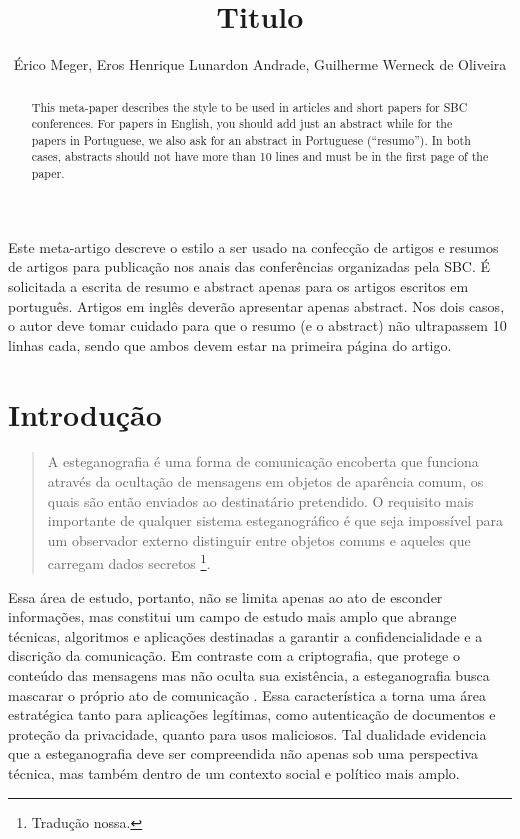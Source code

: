 \documentclass[12pt]{article}
\title{Titulo}
\author{Érico Meger\inst{1}, Eros Henrique Lunardon Andrade\inst{1}, Guilherme Werneck de Oliveira\inst{1}}
\begin{document}
\maketitle

\begin{abstract}
  This meta-paper describes the style to be used in articles and short papers
  for SBC conferences. For papers in English, you should add just an abstract
  while for the papers in Portuguese, we also ask for an abstract in
  Portuguese (``resumo''). In both cases, abstracts should not have more than
  10 lines and must be in the first page of the paper.
\end{abstract}

\begin{resumo}
  Este meta-artigo descreve o estilo a ser usado na confecção de artigos e
  resumos de artigos para publicação nos anais das conferências organizadas
  pela SBC. É solicitada a escrita de resumo e abstract apenas para os artigos
  escritos em português. Artigos em inglês deverão apresentar apenas abstract.
  Nos dois casos, o autor deve tomar cuidado para que o resumo (e o abstract)
  não ultrapassem 10 linhas cada, sendo que ambos devem estar na primeira
  página do artigo.
\end{resumo}

\section{Introdução}

\begin{quote}
  \small{A esteganografia é uma forma de comunicação encoberta que funciona através da ocultação de mensagens em objetos de aparência comum,
    os quais são então enviados ao destinatário pretendido. O requisito mais importante de qualquer sistema esteganográfico é que seja impossível para um observador externo distinguir entre objetos comuns e aqueles que carregam dados secretos} \cite{Fridrich2010}\footnote{Tradução nossa.}.
\end{quote}

Essa área de estudo, portanto, não se limita apenas ao ato de esconder
informações, mas constitui um campo de estudo mais amplo que abrange técnicas,
algoritmos e aplicações destinadas a garantir a confidencialidade e a discrição
da comunicação. Em contraste com a criptografia, que protege o conteúdo das
mensagens mas não oculta sua existência, a esteganografia busca mascarar o
próprio ato de comunicação \cite{Fridrich2010}. Essa característica a torna uma
área estratégica tanto para aplicações legítimas, como autenticação de
documentos e proteção da privacidade, quanto para usos maliciosos. Tal
dualidade evidencia que a esteganografia deve ser compreendida não apenas sob
uma perspectiva técnica, mas também dentro de um contexto social e político
mais amplo.
\end{document}
